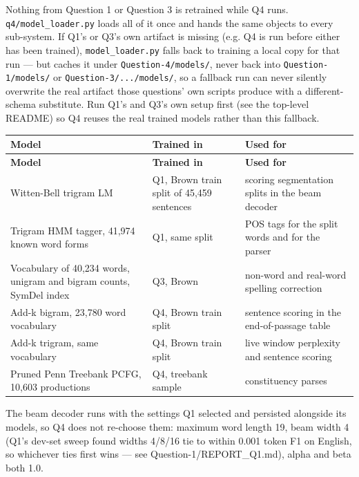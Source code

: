 \documentclass[11pt,a4paper]{article}
\begin{document}
Nothing from Question 1 or Question 3 is retrained while Q4 runs. \texttt{q4/\allowbreak{}model\_\allowbreak{}loader.\allowbreak{}py} loads all of it once and hands the same objects to every sub-system. If Q1's or Q3's own artifact is missing (e.g. Q4 is run before either has been trained), \texttt{model\_\allowbreak{}loader.\allowbreak{}py} falls back to training a local copy for that run --- but caches it under \texttt{Question-\allowbreak{}4/\allowbreak{}models/\allowbreak{}}, never back into \texttt{Question-\allowbreak{}1/\allowbreak{}models/\allowbreak{}} or \texttt{Question-\allowbreak{}3/\allowbreak{}.\allowbreak{}.\allowbreak{}.\allowbreak{}/\allowbreak{}models/\allowbreak{}}, so a fallback run can never silently overwrite the real artifact those questions' own scripts produce with a different-schema substitute. Run Q1's and Q3's own setup first (see the top-level README) so Q4 reuses the real trained models rather than this fallback.

{\footnotesize
\setlength{\tabcolsep}{4pt}
\begin{xltabular}{\linewidth}{>{\raggedright\arraybackslash}X>{\raggedright\arraybackslash}X>{\raggedright\arraybackslash}X}
\toprule
\textbf{Model} & \textbf{Trained in} & \textbf{Used for} \\
\midrule
\endfirsthead
\toprule
\textbf{Model} & \textbf{Trained in} & \textbf{Used for} \\
\midrule
\endhead
Witten-Bell trigram LM & Q1, Brown train split of 45,459 sentences & scoring segmentation splits in the beam decoder \\
Trigram HMM tagger, 41,974 known word forms & Q1, same split & POS tags for the split words and for the parser \\
Vocabulary of 40,234 words, unigram and bigram counts, SymDel index & Q3, Brown & non-word and real-word spelling correction \\
Add-k bigram, 23,780 word vocabulary & Q4, Brown train split & sentence scoring in the end-of-passage table \\
Add-k trigram, same vocabulary & Q4, Brown train split & live window perplexity and sentence scoring \\
Pruned Penn Treebank PCFG, 10,603 productions & Q4, treebank sample & constituency parses \\
\bottomrule
\end{xltabular}}

The beam decoder runs with the settings Q1 selected and persisted alongside its models, so Q4 does not re-choose them: maximum word length 19, beam width 4 (Q1's dev-set sweep found widths 4/8/16 tie to within 0.001 token F1 on English, so whichever ties first wins --- see Question-1/REPORT\_Q1.md), alpha and beta both 1.0.
\end{document}
